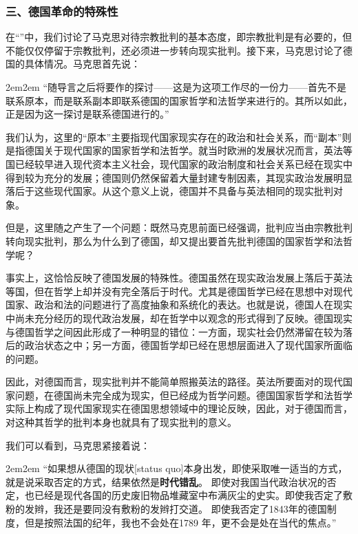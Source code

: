 \documentclass[a4paper,twoside,12pt,AutoFakeBold]{ctexart}
\begin{document}
\subsubsection{三、德国革命的特殊性}

在“”中，我们讨论了马克思对待宗教批判的基本态度，即宗教批判是有必要的，但不能仅仅停留于宗教批判，还必须进一步转向现实批判。接下来，马克思讨论了德国的具体情况。马克思首先说：

\begin{adjustwidth}{2em}{2em}
\qquad\fangsong
“随导言之后将要作的探讨——这是为这项工作尽的一份力——首先不是联系原本，而是联系副本即联系德国的国家哲学和法哲学来进行的。其所以如此，正是因为这一探讨是联系德国进行的。”
\end{adjustwidth}

我们认为，这里的“原本”主要指现代国家现实存在的政治和社会关系，而“副本”则是指德国关于现代国家的国家哲学和法哲学。就当时欧洲的发展状况而言，英法等国已经较早进入现代资本主义社会，现代国家的政治制度和社会关系已经在现实中得到较为充分的发展；德国则仍然保留着大量封建专制因素，其现实政治发展明显落后于这些现代国家。从这个意义上说，德国并不具备与英法相同的现实批判对象。

但是，这里随之产生了一个问题：既然马克思前面已经强调，批判应当由宗教批判转向现实批判，那么为什么到了德国，却又提出要首先批判德国的国家哲学和法哲学呢？

事实上，这恰恰反映了德国发展的特殊性。德国虽然在现实政治发展上落后于英法等国，但在哲学上却并没有完全落后于时代。尤其是德国哲学已经在思想中对现代国家、政治和法的问题进行了高度抽象和系统化的表达。也就是说，德国人在现实中尚未充分经历的现代政治发展，却在哲学中以观念的形式得到了反映。德国现实与德国哲学之间因此形成了一种明显的错位：一方面，现实社会仍然滞留在较为落后的政治状态之中；另一方面，德国哲学却已经在思想层面进入了现代国家所面临的问题。

因此，对德国而言，现实批判并不能简单照搬英法的路径。英法所要面对的现代国家问题，在德国尚未完全成为现实，但已经成为哲学问题。德国国家哲学和法哲学实际上构成了现代国家现实在德国思想领域中的理论反映，因此，对于德国而言，对这种其哲学的批判本身也就具有了现实批判的意义。

我们可以看到，马克思紧接着说：

\begin{adjustwidth}{2em}{2em}
\qquad\fangsong
“如果想从德国的现状[status quo]本身出发，即使采取唯一适当的方式，就是说采取否定的方式，结果依然是\textbf{时代错乱}。 即使对我国当代政治状况的否定，也已经是现代各国的历史废旧物品堆藏室中布满灰尘的史实。即使我否定了敷粉的发辫，我还是要同没有敷粉的发辫打交道。 即使我否定了1843年的德国制度，但是按照法国的纪年，我也不会处在1789 年，更不会是处在当代的焦点。”
\end{adjustwidth}
\end{document}

